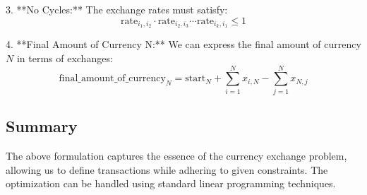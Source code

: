 \documentclass{article}
\begin{document}
3. **No Cycles:**
   The exchange rates must satisfy:
   \[
   \text{rate}_{i_1,i_2} \cdot \text{rate}_{i_2,i_3} \cdots \text{rate}_{i_k,i_1} \leq 1
   \]

4. **Final Amount of Currency N:**
   We can express the final amount of currency \( N \) in terms of exchanges:
   \[
   \text{final\_amount\_of\_currency}_N = \text{start}_N + \sum_{i=1}^{N} x_{i,N} - \sum_{j=1}^{N} x_{N,j}
   \]

\subsection*{Summary}
The above formulation captures the essence of the currency exchange problem, allowing us to define transactions while adhering to given constraints. The optimization can be handled using standard linear programming techniques.
\end{document}

